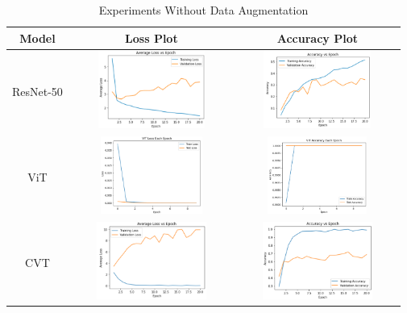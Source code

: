 \documentclass{article}
\begin{document}
\FloatBarrier
\begin{table}
	\begin{center}
		\caption{Experiments Without Data Augmentation}
		
		\begin{tabular}{|c|c|c|}
			\hline
			\rule{0pt}{20pt}
			\textbf{Model} &       \textbf{Loss Plot}       &     \textbf{Accuracy Plot}     \\ \hline
			\rule{0pt}{80pt}
			  ResNet-50    & \includegraphics[width=2in, height = 1in]{1} & \includegraphics[width=2in, height = 1in]{2} \\ \hline
			  \rule{0pt}{80pt}
			     ViT       & \includegraphics[width=2in, height = 1in]{3} & \includegraphics[width=2in, height = 1in]{4} \\ \hline
			     \rule{0pt}{80pt}
			     CVT       & \includegraphics[width=2in, height = 1in]{5} & \includegraphics[width=2in, height = 1in]{6} \\ \hline
			     
		\end{tabular}
	\end{center}
\end{table}
\end{document}
